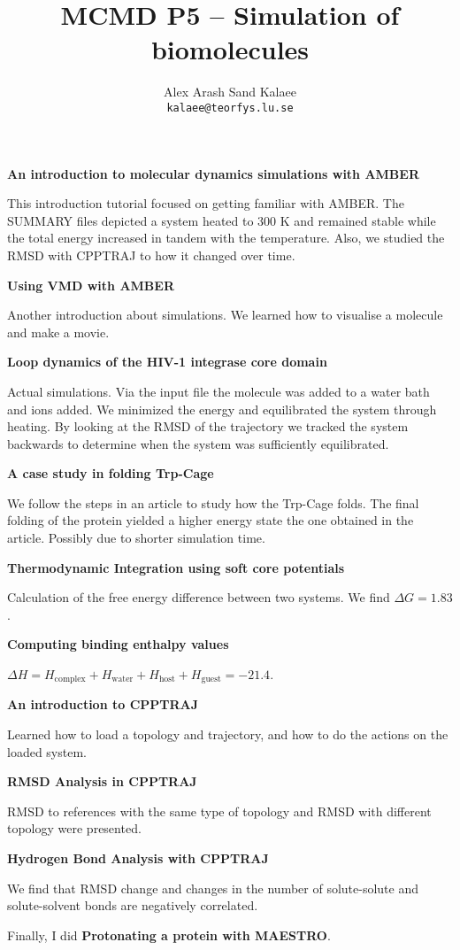 \documentclass{article}
\begin{document}
\title{MCMD P5 -- Simulation of biomolecules}
\author{Alex Arash Sand Kalaee\\ \texttt{kalaee@teorfys.lu.se}}
\maketitle

\textbf{An introduction to molecular dynamics simulations with AMBER}

This introduction tutorial focused on getting familiar with AMBER.
The SUMMARY files depicted a system heated to 300 K and remained stable while the total energy increased in tandem with the temperature. Also, we studied the RMSD with CPPTRAJ to how it changed over time.

\textbf{Using VMD with AMBER}

Another introduction about simulations. We learned how to visualise a molecule and make a movie.

\textbf{Loop dynamics of the HIV-1 integrase core domain}

Actual simulations. Via the input file the molecule was added to
a water bath and ions added. We minimized the energy and
equilibrated the system through heating. By looking at the RMSD
of the trajectory we tracked the system backwards to determine when
the system was sufficiently equilibrated.

\textbf{A case study in folding Trp-Cage}

We follow the steps in an article to study how the 
Trp-Cage folds. The final folding of the protein yielded a
higher energy state the one obtained in the article. Possibly due to shorter simulation time.

\textbf{Thermodynamic Integration using soft core potentials}

Calculation of the free energy difference between two systems.
We find $\Delta G =1.83$.

\textbf{Computing binding enthalpy values}

$\Delta H = H_\mathrm{complex} + H_\mathrm{water} + H_\mathrm{host}+H_\mathrm{guest} = -21.4 $.

\textbf{An introduction to CPPTRAJ}

Learned how to load a topology and trajectory, and how to do the
actions on the loaded system.

\textbf{RMSD Analysis in CPPTRAJ}

RMSD to references with the same type of topology and RMSD with different topology were presented.

\textbf{Hydrogen Bond Analysis with CPPTRAJ}

We find that RMSD change and changes in the number of solute-solute and solute-solvent bonds are negatively correlated.


Finally, I did \textbf{Protonating a protein with MAESTRO}.
\end{document}
